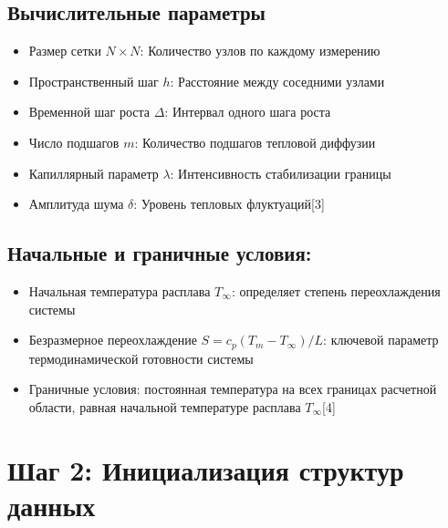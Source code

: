 \documentclass[
  12pt,
  a4paper,
  DIV=11,
  numbers=noendperiod]{scrreprt}
\providecommand{\tightlist}{%
  \setlength{\itemsep}{0pt}\setlength{\parskip}{0pt}}\usepackage{longtable,booktabs,array}
\begin{document}
\subsection{Вычислительные
параметры}\label{ux432ux44bux447ux438ux441ux43bux438ux442ux435ux43bux44cux43dux44bux435-ux43fux430ux440ux430ux43cux435ux442ux440ux44b}

\begin{itemize}
\tightlist
\item
  Размер сетки \(N \times N\): Количество узлов по каждому измерению
\item
  Пространственный шаг \(h\): Расстояние между соседними узлами
\item
  Временной шаг роста \(\Delta\): Интервал одного шага роста
\item
  Число подшагов \(m\): Количество подшагов тепловой диффузии
\item
  Капиллярный параметр \(\lambda\): Интенсивность стабилизации границы
\item
  Амплитуда шума \(\delta\): Уровень тепловых флуктуаций{[}3{]}
\end{itemize}

\subsection{Начальные и граничные
условия:}\label{ux43dux430ux447ux430ux43bux44cux43dux44bux435-ux438-ux433ux440ux430ux43dux438ux447ux43dux44bux435-ux443ux441ux43bux43eux432ux438ux44f}

\begin{itemize}
\tightlist
\item
  Начальная температура расплава \(T_\infty\): определяет степень
  переохлаждения системы
\item
  Безразмерное переохлаждение \(S = c_p (T_m - T_\infty)/L\): ключевой
  параметр термодинамической готовности системы
\item
  Граничные условия: постоянная температура на всех границах расчетной
  области, равная начальной температуре расплава \(T_\infty\){[}4{]}
\end{itemize}

\section{Шаг 2: Инициализация структур
данных}\label{ux448ux430ux433-2-ux438ux43dux438ux446ux438ux430ux43bux438ux437ux430ux446ux438ux44f-ux441ux442ux440ux443ux43aux442ux443ux440-ux434ux430ux43dux43dux44bux445}
\end{document}
